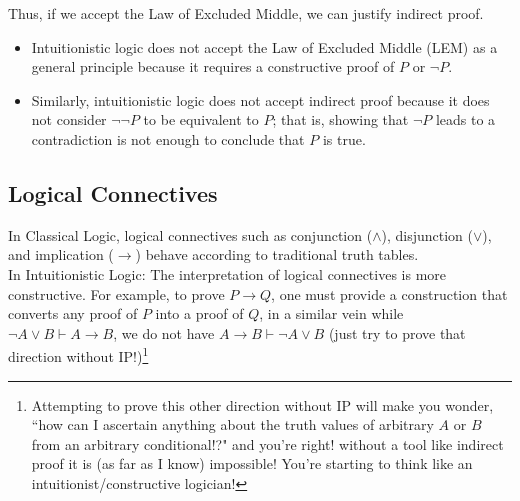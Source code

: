 
Thus, if we accept the Law of Excluded Middle, we can justify indirect proof.

\begin{itemize}
    \item Intuitionistic logic does not accept the Law of Excluded Middle (LEM) as a general principle because it requires a constructive proof of \( P \) or \( \neg P \).
    \item Similarly, intuitionistic logic does not accept indirect proof because it does not consider \( \neg \neg P \) to be equivalent to \( P \); that is, showing that \( \neg P \) leads to a contradiction is not enough to conclude that \( P \) is true.
\end{itemize}

\subsection{Logical Connectives}
In Classical Logic, logical connectives such as conjunction ($\wedge$), disjunction ($\lor$), and implication ($\rightarrow$) behave according to traditional truth tables. \\

\noindent In Intuitionistic Logic: The interpretation of logical connectives is more constructive. For example, to prove $P\rightarrow Q$, one must provide a construction that converts any proof of $P$ into a proof of $Q$, in a similar vein while $\neg A \lor B \vdash A\rightarrow B$, we do not have $A\rightarrow B \vdash \neg A \lor B$ (just try to prove that direction without IP!)\footnote{Attempting to prove this other direction without IP will make you wonder, ``how can I ascertain anything about the truth values of arbitrary $A$ or $B$ from an arbitrary conditional!?" and you're right! without a tool like indirect proof it is (as far as I know) impossible! You're starting to think like an intuitionist/constructive logician!}

